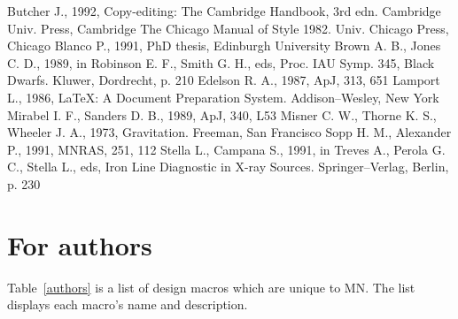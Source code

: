\begin{thebibliography}{}
    Butcher J., 1992, Copy-editing: The Cambridge 
    Handbook, 3rd edn. Cambridge Univ. Press, 
    Cambridge
   The Chicago Manual of Style 1982. Univ.
    Chicago Press, Chicago
    Blanco P., 1991, PhD thesis, Edinburgh 
    University
   Brown A. B., Jones C. D., 1989, 
    in Robinson E. F., Smith G. H., eds,
    Proc. IAU Symp. 345, Black Dwarfs. 
    Kluwer, Dordrecht, p. 210
    Edelson R. A., 1987, ApJ, 313, 651
    Lamport L., 1986, \LaTeX: A Document 
    Preparation System. Addison--Wesley, New York
   Mirabel I. F., Sanders D. B., 1989, 
    ApJ, 340, L53 
   Misner C. W., Thorne K. S., 
    Wheeler J. A., 1973, Gravitation. 
    Freeman, San Francisco
   Sopp H. M., Alexander P., 1991, 
    MNRAS, 251, 112
   Stella L., Campana S., 1991, in 
    Treves A., Perola G. C., Stella L., eds, 
    Iron Line Diagnostic in X-ray Sources. 
    Springer--Verlag, Berlin, p. 230
\end{thebibliography}


\appendix
\section{For authors}

Table~\ref{authors} is a list of design macros which are unique to MN. The
list displays each macro's name and description.

